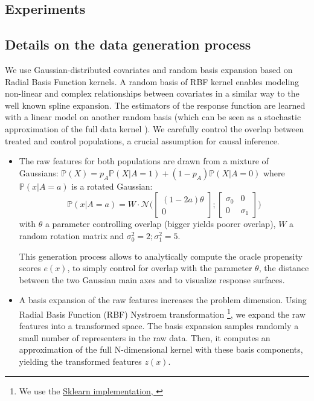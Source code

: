 \documentclass{report}
\begin{document}
\begin{appendices}
  \section{Experiments}

  \subsection{Details on the data generation process}
  \label{apd:experiments:generation}

  We use Gaussian-distributed covariates and random basis expansion based on
  Radial Basis Function kernels. A random basis of RBF kernel enables modeling
  non-linear and complex relationships between covariates in a similar way to the
  well known spline expansion. The estimators of the response function are learned
  with a linear model on another random basis (which can be seen as a stochastic
  approximation of the full data kernel \citep{rahimi_random_2008}). We
  carefully control the overlap between treated and control populations,
  a crucial assumption for causal inference.

  \begin{itemize}
    \item The raw features for both populations are drawn from a mixture of
          Gaussians:
          $\mathbb P(X) = p_A \mathbb P(X|A=1) + (1- p_A) \mathbb P(X|A=0)$
          where $\mathbb P(x|A=a)$ is a rotated Gaussian:
          \begin{equation}
            \mathbb P(x|A=a) = W \cdot \mathcal N \Big( \begin{bmatrix} (1-2a) \theta \\ 0\end{bmatrix} ; \begin{bmatrix} \sigma_0 & 0 \\ 0 & \sigma_1\end{bmatrix} \Big)
          \end{equation}
          with $\theta$ a parameter controlling overlap (bigger yields poorer
          overlap), $W$ a random rotation matrix and $\sigma_0^2=2;\sigma_1^2=5$.

          This generation process allows to analytically compute the oracle
          propensity scores $e(x)$, to simply control for overlap with the
          parameter $\theta$, the distance between the two Gaussian main axes and
          to  visualize response surfaces.

    \item A basis expansion of the raw features increases the problem dimension.
          Using Radial Basis Function (RBF) Nystroem transformation \footnote{We use the
            \href{https://scikit-learn.org/stable/modules/generated/sklearn.kernel_approximation.Nystroem.html}{Sklearn
              implementation, \citep{pedregosa_scikitlearn_2011}}}, we expand the raw
          features into a transformed space. The basis expansion samples randomly a
          small number of representers in the raw data. Then,  it computes an
          approximation of the full N-dimensional kernel with these basis components,
          yielding the transformed features $z(x)$.


\end{itemize}
\end{appendices}
\end{document}
